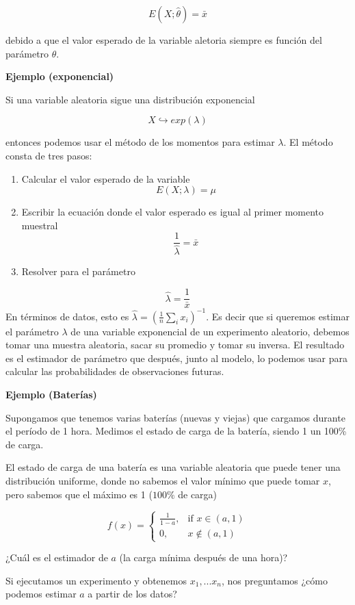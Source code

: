 \documentclass[
]{book}
\begin{document}
\[E(X; \hat{\theta})=\bar{x}\]

debido a que el valor esperado de la variable aletoria siempre es función del parámetro \(\theta\).

\textbf{Ejemplo (exponencial)}

Si una variable aleatoria sigue una distribución exponencial

\[X \hookrightarrow exp(\lambda)\]

entonces podemos usar el método de los momentos para estimar \(\lambda\). El método consta de tres pasos:

\begin{enumerate}
\def\labelenumi{\arabic{enumi}.}
\item
  Calcular el valor esperado de la variable \[E(X; \lambda)=\mu\]
\item
  Escribir la ecuación donde el valor esperado es igual al primer momento muestral \[\frac{1}{\hat{\lambda}}=\bar{x}\]
\item
  Resolver para el parámetro
\end{enumerate}

\[\hat{\lambda}=\frac{1}{\bar{x}}\]
En términos de datos, esto es \(\hat{\lambda}=(\frac{1}{n}\sum_i x_i)^{-1}\). Es decir que si queremos estimar el parámetro \(\lambda\) de una variable exponencial de un experimento aleatorio, debemos tomar una muestra aleatoria, sacar su promedio y tomar su inversa. El resultado es el estimador de parámetro que después, junto al modelo, lo podemos usar para calcular las probabilidades de observaciones futuras.

\textbf{Ejemplo (Baterías)}

Supongamos que tenemos varias baterías (nuevas y viejas) que cargamos durante el período de 1 hora. Medimos el estado de carga de la batería, siendo 1 un 100\% de carga.

El estado de carga de una batería es una variable aleatoria que puede tener una distribución uniforme, donde no sabemos el valor mínimo que puede tomar \(x\), pero sabemos que el máximo es 1 (\(100\%\) de carga)

\[
f(x)=
\begin{cases}
    \frac{1}{1-a},& \text{if } x\in (a,1)\\
    0,& x\notin (a,1)
\end{cases}
\]

¿Cuál es el estimador de \(a\) (la carga mínima después de una hora)?

Si ejecutamos un experimento y obtenemos \(x_1,...x_n\), nos preguntamos ¿cómo podemos estimar \(a\) a partir de los datos?
\end{document}
